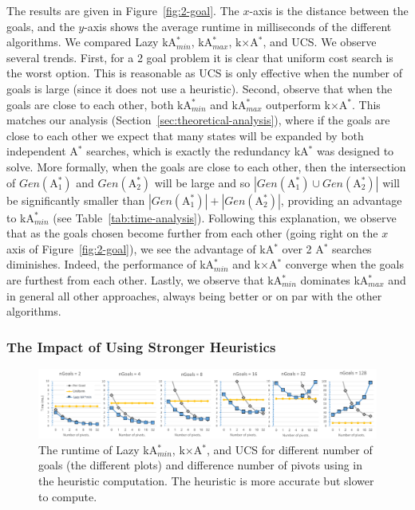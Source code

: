 \documentclass{aicom2e}
\newcommand{\astar}{A$^*$}
\newcommand{\kastar}{kA$^*$}
\newcommand{\kastarmin}{kA$^*_{min}$}
\newcommand{\kastarmax}{kA$^*_{max}$}
\newcommand{\kxastar}{k$\times$A$^*$}
\newcommand{\astari}[1]{A$^*_#1$}
\begin{document}
The results are given in Figure~\ref{fig:2-goal}. The $x$-axis is the distance between the goals, and the $y$-axis shows the average runtime in milliseconds of the different algorithms. We compared Lazy \kastarmin{}, \kastarmax{}, \kxastar{}, and UCS.
We observe several trends.
First, for a 2 goal problem it is clear that uniform cost search is the worst option.
This is reasonable as UCS is only effective when the number of goals is large (since it does not use a heuristic). %
Second, observe that when the goals are close to each other, both \kastarmin{}
and \kastarmax{} outperform \kxastar{}. This matches our analysis (Section~\ref{sec:theoretical-analysis}), where if the goals are close to each other we expect that many states will be expanded by both independent \astar{} searches, which is  exactly the redundancy \kastar{} was designed to solve. More formally,
when the goals are close to each other, then the intersection of $Gen(\text{\astari{1}})$ and $Gen(\text{\astari{2}})$ will be large and so $|Gen(\text{\astari{1}})\cup Gen(\text{\astari{2}})|$ will be significantly smaller than $|Gen(\text{\astari{1}})|+|Gen(\text{\astari{2}})|$, providing an advantage to \kastarmin{} (see Table~\ref{tab:time-analysis}).
Following this explanation, we observe that as the goals chosen become further from each other (going right on the $x$ axis of Figure~\ref{fig:2-goal}), we see the advantage of \kastar{} over 2 \astar{} searches diminishes. Indeed, the performance of \kastarmin{}  and \kxastar{} converge when the goals are furthest from each other.
Lastly, we observe that \kastarmin{} dominates \kastarmax{} and in general all other approaches, always being better or on par with the other algorithms.

\subsubsection{The Impact of Using Stronger Heuristics}

\begin{figure}
    \includegraphics[width=\textwidth]{heuristic-power_cropped.pdf}
    \caption{The runtime of Lazy \kastarmin{}, \kxastar{}, and UCS for different number of goals (the different plots) and difference number of pivots using in the heuristic computation. The heuristic is more accurate but slower to compute.}
    \label{fig:dh-results}
\end{figure}
\end{document}
